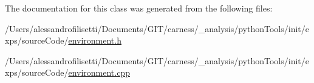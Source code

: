 The documentation for this class was generated from the following files\+:\begin{DoxyCompactItemize}
\item 
/\+Users/alessandrofilisetti/\+Documents/\+G\+I\+T/carness/\+\_\+analysis/python\+Tools/init/exps/source\+Code/\hyperlink{a00062}{environment.\+h}\item 
/\+Users/alessandrofilisetti/\+Documents/\+G\+I\+T/carness/\+\_\+analysis/python\+Tools/init/exps/source\+Code/\hyperlink{a00060}{environment.\+cpp}\end{DoxyCompactItemize}
